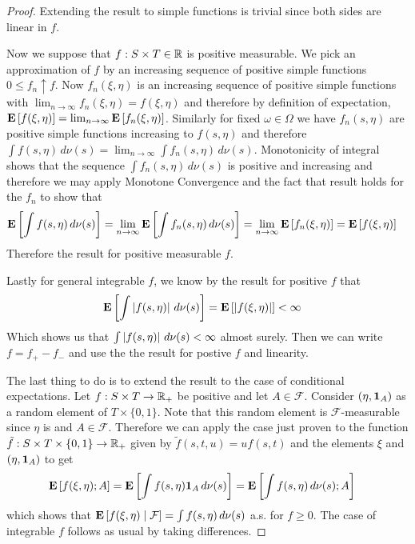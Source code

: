 \begin{proof}
Extending the result to simple functions is trivial since both sides
are linear in $f$.

Now we suppose that $f : S \times T \in \reals$ is positive
measurable.  We pick an approximation of $f$ by an increasing sequence
of positive simple functions $0 \leq f_n \uparrow f$.  Now $f_n(\xi,
\eta)$ is an increasing sequence of positive simple functions with
$\lim_{n \to \infty} f_n(\xi, \eta) = f(\xi, \eta)$ and therefore by
definition of expectation, $\expectation{f(\xi, \eta)} = \lim_{n \to
  \infty} \expectation{f_n(\xi, \eta)}$.  Similarly for fixed $\omega
\in \Omega$ we have $f_n(s, \eta)$ are positive simple functions increasing to
$f(s, \eta)$ and therefore $\int f(s, \eta) \, d\nu(s) = \lim_{n \to
  \infty} \int f_n(s, \eta) \, d\nu(s)$.  Monotonicity of integral shows
that  the sequence $\int f_n(s, \eta) \, d\nu(s)$ is positive and
increasing and therefore we may apply Monotone Convergence and the
fact that result holds for the $f_n$ to show
that 
\begin{align*}
\expectation{\int f(s, \eta) \, d\nu(s)} &= \lim_{n \to
  \infty} \expectation{\int f_n(s, \eta) \, d\nu(s)} = \lim_{n \to \infty} \expectation{f_n(\xi, \eta)} = \expectation{f(\xi, \eta)}
\end{align*}  
Therefore the
result for positive measurable $f$.

Lastly for general integrable $f$, we know by the result for positive
$f$ that
\begin{align*}
\expectation{\int \abs{f(s, \eta)} \, d\nu(s)} &=
\expectation{\abs{f(\xi, \eta)}} < \infty
\end{align*}
Which shows us that $\int \abs{f(s, \eta)} \, d\nu(s) < \infty$ almost
surely.  Then we can write $f = f_+ - f_-$ and use the the result for
postive $f$ and linearity.

The last thing to do is to extend the result to the case of
conditional expectations.  Let $f : S \times T \to \reals_+$ be
positive and let $A \in \mathcal{F}$.  Consider $(\eta,
\characteristic{A})$ as a random element of $T \times \lbrace 0,1\rbrace$.  Note that this
random element is $\mathcal{F}$-measurable since $\eta$ is and $A \in
\mathcal{F}$.  Therefore we can apply the case just proven to the
function $\tilde{f} : S \times T \times \lbrace 0,1 \rbrace \to
\reals_+$ given by $\tilde{f}(s,t,u) = u f(s,t)$ and the elements $\xi$
and $(\eta, \characteristic{A})$ to get
\begin{align*}
\expectation{f(\xi, \eta) ; A} &= \expectation {\int f(s, \eta)
  \characteristic{A} \, d\nu(s)} = \expectation {\int f(s, \eta)
  \, d\nu(s) ; A}
\end{align*}
which shows that $\cexpectationlong{\mathcal{F}}{f(\xi,\eta)} = \int f(s, \eta)
  \, d\nu(s)$ a.s. for $f \geq 0$.  The case of integrable $f$ follows as
  usual by taking differences.
\end{proof}

